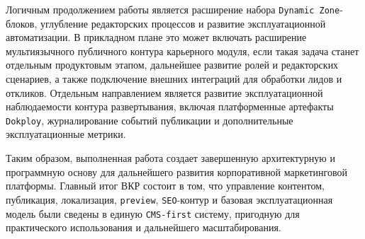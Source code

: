 
Логичным продолжением работы является расширение набора \texttt{Dynamic Zone}-блоков,
углубление редакторских процессов и развитие эксплуатационной автоматизации. В прикладном
плане это может включать расширение мультиязычного публичного контура карьерного модуля,
если такая задача станет отдельным продуктовым этапом, дальнейшее развитие ролей и
редакторских сценариев, а также подключение внешних
интеграций для обработки лидов и откликов. Отдельным направлением является развитие
эксплуатационной наблюдаемости контура развертывания, включая платформенные артефакты
\texttt{Dokploy}, журналирование событий публикации и дополнительные эксплуатационные
метрики.

Таким образом, выполненная работа создает завершенную архитектурную и программную основу
для дальнейшего развития корпоративной маркетинговой платформы. Главный итог ВКР состоит
в том, что управление контентом, публикация, локализация, \texttt{preview},
\texttt{SEO}-контур и базовая эксплуатационная модель были сведены в единую
\texttt{CMS-first} систему, пригодную для практического использования и дальнейшего
масштабирования.
